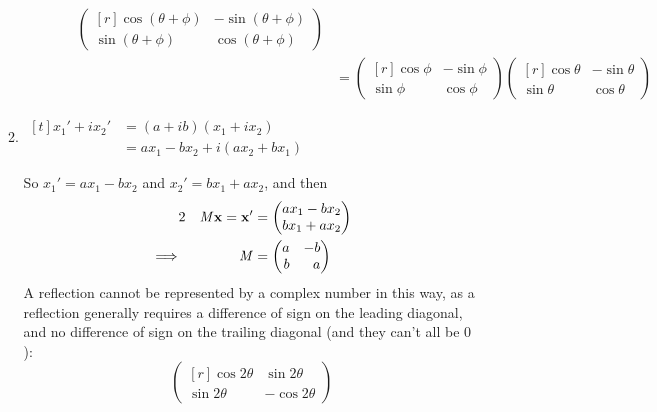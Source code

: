 \documentclass[fleqn,a4paper,11pt]{article}
\begin{document}
\begin{enumerate}[label=\textbf{\arabic*.}]
\begin{enumerate}[label=(\alph*)]
\begin{itemize}
\begin{itemize}
\begin{align*}
\begin{pmatrix*}[r]
            \cos(\theta + \phi) & -\sin(\theta + \phi) \\
            \sin(\theta + \phi) & \cos(\theta + \phi)
           \end{pmatrix*} \\
           &=
           \begin{pmatrix*}[r]
            \cos \phi & -\sin \phi \\
            \sin \phi & \cos \phi
           \end{pmatrix*}
           \begin{pmatrix*}[r]
            \cos \theta & -\sin \theta \\
            \sin \theta & \cos \theta
           \end{pmatrix*}
          \end{align*}
        \end{itemize}
      \end{itemize}
     \item \(
      \begin{aligned}[t]
       x_1' + ix_2'
        &= (a + ib)(x_1 + ix_2) \\
        &= ax_1 - bx_2 + i(ax_2 + bx_1)
      \end{aligned} \)

      So \(x_1' = ax_1 - bx_2\) and \(x_2' = bx_1 + ax_2\), and then
      \begin{alignat*}2
       && \mat M \vec x = \vec x' &=
       \begin{pmatrix}
        ax_1 - bx_2 \\ bx_1 + ax_2
       \end{pmatrix} \\
       \implies{}&& \mat M &=
       \begin{pmatrix*}[r]
        a & -b \\
        b & a
       \end{pmatrix*}
      \end{alignat*}
      A reflection cannot be represented by a complex number in this way, as a
      reflection generally requires a difference of sign on the leading
      diagonal, and no difference of sign on the trailing diagonal (and they
      can't all be \(0\)):
      \begin{equation*}
       \begin{pmatrix*}[r]
        \cos 2\theta & \sin 2\theta \\
        \sin 2\theta & -\cos 2\theta
       \end{pmatrix*}
      \end{equation*}


\end{enumerate}
\end{enumerate}
\end{document}
